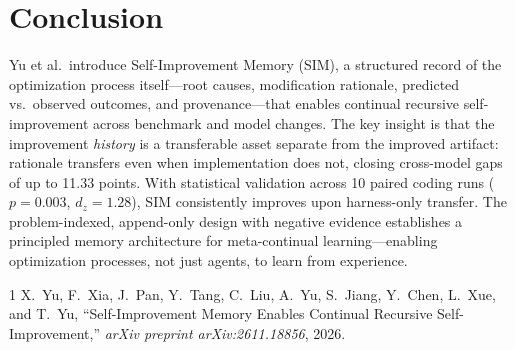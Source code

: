 \documentclass[11pt,a4paper]{article}
\begin{document}
\section{Conclusion}
Yu et al.\ introduce Self-Improvement Memory (SIM), a structured record of the optimization process itself---root causes, modification rationale, predicted vs.\ observed outcomes, and provenance---that enables continual recursive self-improvement across benchmark and model changes. The key insight is that the improvement \emph{history} is a transferable asset separate from the improved artifact: rationale transfers even when implementation does not, closing cross-model gaps of up to 11.33 points. With statistical validation across 10 paired coding runs ($p{=}0.003$, $d_z{=}1.28$), SIM consistently improves upon harness-only transfer. The problem-indexed, append-only design with negative evidence establishes a principled memory architecture for meta-continual learning---enabling optimization processes, not just agents, to learn from experience.

\begin{thebibliography}{1}
X.~Yu, F.~Xia, J.~Pan, Y.~Tang, C.~Liu, A.~Yu, S.~Jiang, Y.~Chen, L.~Xue, and T.~Yu,
``Self-Improvement Memory Enables Continual Recursive Self-Improvement,''
\textit{arXiv preprint arXiv:2611.18856}, 2026.
\end{thebibliography}
\end{document}
